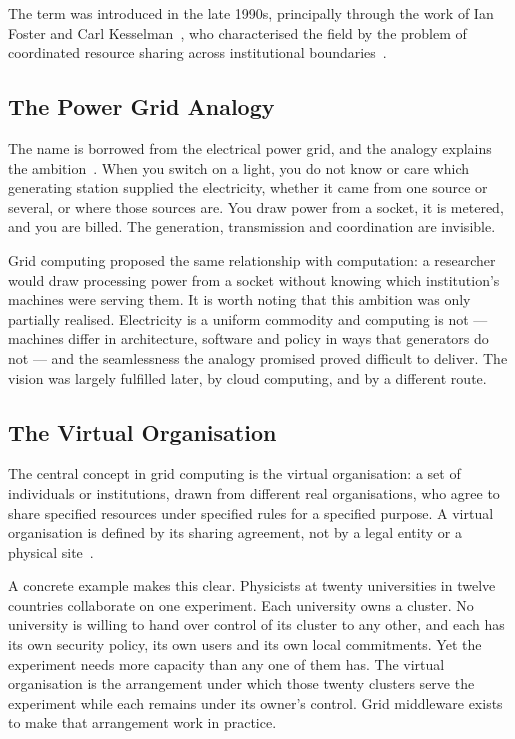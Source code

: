 \documentclass[../main.tex]{subfiles}
\begin{document}
The term was introduced in the late 1990s, principally through the work of
Ian Foster and Carl Kesselman~, who characterised the field
by the problem of coordinated resource sharing across institutional
boundaries~.

\subsection{The Power Grid Analogy}

The name is borrowed from the electrical power grid, and the analogy explains
the ambition~. When you switch on a light, you do not know or care which
generating station supplied the electricity, whether it came from one source
or several, or where those sources are. You draw power from a socket, it is
metered, and you are billed. The generation, transmission and coordination
are invisible.

Grid computing proposed the same relationship with computation: a researcher
would draw processing power from a socket without knowing which
institution's machines were serving them. It is worth noting that this
ambition was only partially realised. Electricity is a uniform commodity and
computing is not --- machines differ in architecture, software and policy in
ways that generators do not --- and the seamlessness the analogy promised
proved difficult to deliver. The vision was largely fulfilled later, by cloud
computing, and by a different route.

\subsection{The Virtual Organisation}

The central concept in grid computing is the virtual organisation: a set of
individuals or institutions, drawn from different real organisations, who
agree to share specified resources under specified rules for a specified
purpose. A virtual organisation is defined by its sharing agreement, not by a
legal entity or a physical site~.

A concrete example makes this clear. Physicists at twenty universities in
twelve countries collaborate on one experiment. Each university owns a
cluster. No university is willing to hand over control of its cluster to any
other, and each has its own security policy, its own users and its own local
commitments. Yet the experiment needs more capacity than any one of them has.
The virtual organisation is the arrangement under which those twenty clusters
serve the experiment while each remains under its owner's control. Grid
middleware exists to make that arrangement work in practice.
\end{document}
